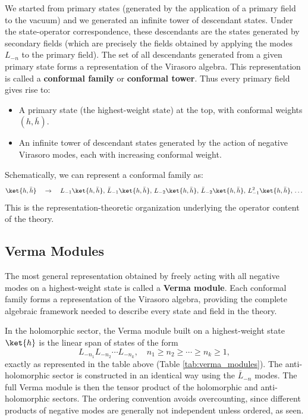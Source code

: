 We started from primary states (generated by the application of a primary field to the vacuum) and we generated an infinite tower of descendant states. Under the state-operator correspondence, these descendants are the states generated by secondary fields (which are precisely the fields obtained by applying the modes \(L_{-n}\) to the primary field). The set of all descendants generated from a given primary state forms a representation of the Virasoro algebra. This representation is called a \textbf{conformal family} or \textbf{conformal tower}. Thus every primary field gives rise to:
\begin{itemize}
    \item A primary state (the highest-weight state) at the top, with conformal weights \((h, \bar{h})\).
    \item An infinite tower of descendant states generated by the action of negative Virasoro modes, each with increasing conformal weight.
\end{itemize}

Schematically, we can represent a conformal family as:
\[
    \ket{h, \bar{h}} \quad \rightarrow \quad L_{-1}\ket{h, \bar{h}}, \, \bar{L}_{-1} \ket{h, \bar{h}}, \, L_{-2}\ket{h, \bar{h}}, \, \bar{L}_{-2} \ket{h, \bar{h}}, \, L_{-1}^2\ket{h, \bar{h}}, \, \dots
\]
This is the representation-theoretic organization underlying the operator content of the theory.

\subsection{Verma Modules}

The most general representation obtained by freely acting with all negative modes on a highest-weight state is called a \textbf{Verma module}. Each conformal family forms a representation of the Virasoro algebra, providing the complete algebraic framework needed to describe every state and field in the theory.

In the holomorphic sector, the Verma module built on a highest-weight state \(\ket{h}\) is the linear span of states of the form
\[
    L_{-n_1} L_{-n_2} \cdots L_{-n_k}, \quad n_1 \geq n_2 \geq \cdots \geq n_k \geq 1,
\]
exactly as represented in the table above (Table \ref{tab:verma_modules}). The anti-holomorphic sector is constructed in an identical way using the \(\bar{L}_{-n}\) modes. The full Verma module is then the tensor product of the holomorphic and anti-holomorphic sectors. The ordering convention avoids overcounting, since different products of negative modes are generally not independent unless ordered, as seen.

